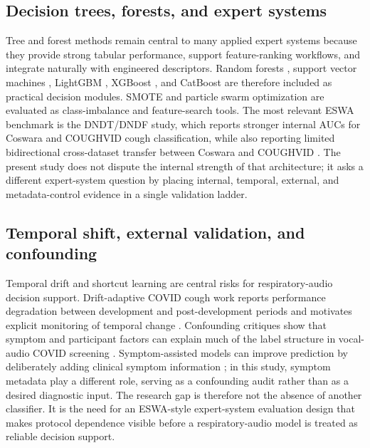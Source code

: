 \documentclass[preprint,12pt]{elsarticle}
\begin{document}
\subsection{Decision trees, forests, and expert systems}

Tree and forest methods remain central to many applied expert systems because they provide strong tabular performance, support feature-ranking workflows, and integrate naturally with engineered descriptors. Random forests \citep{breiman2001random}, support vector machines \citep{cortes1995svm}, LightGBM \citep{ke2017lightgbm}, XGBoost \citep{chen2016xgboost}, and CatBoost \citep{prokhorenkova2018catboost} are therefore included as practical decision modules. SMOTE \citep{chawla2002smote} and particle swarm optimization \citep{kennedy1995pso} are evaluated as class-imbalance and feature-search tools. The most relevant ESWA benchmark is the DNDT/DNDF study, which reports stronger internal AUCs for Coswara and COUGHVID cough classification, while also reporting limited bidirectional cross-dataset transfer between Coswara and COUGHVID \citep{islam2026dndf}. The present study does not dispute the internal strength of that architecture; it asks a different expert-system question by placing internal, temporal, external, and metadata-control evidence in a single validation ladder.

\subsection{Temporal shift, external validation, and confounding}

Temporal drift and shortcut learning are central risks for respiratory-audio decision support. Drift-adaptive COVID cough work reports performance degradation between development and post-development periods and motivates explicit monitoring of temporal change \citep{ganitidis2025drift}. Confounding critiques show that symptom and participant factors can explain much of the label structure in vocal-audio COVID screening \citep{coppock2024audio}. Symptom-assisted models can improve prediction by deliberately adding clinical symptom information \citep{lin2025sympcoughnet}; in this study, symptom metadata play a different role, serving as a confounding audit rather than as a desired diagnostic input. The research gap is therefore not the absence of another classifier. It is the need for an ESWA-style expert-system evaluation design that makes protocol dependence visible before a respiratory-audio model is treated as reliable decision support.
\end{document}
